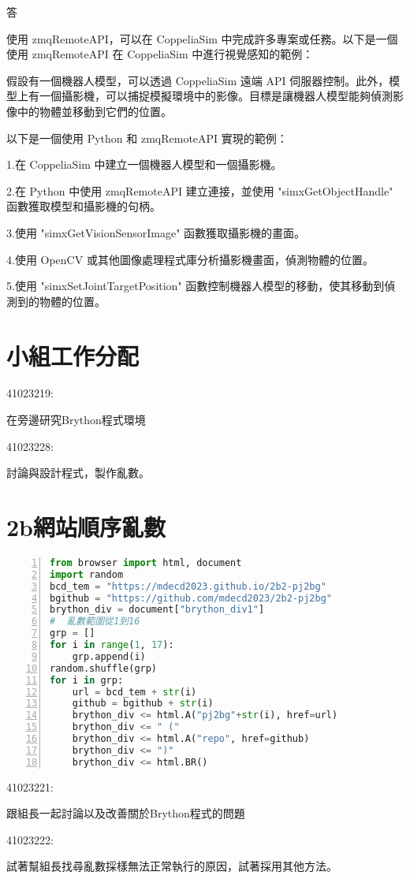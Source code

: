 答

使用 zmqRemoteAPI，可以在 CoppeliaSim 中完成許多專案或任務。以下是一個使用 zmqRemoteAPI 在 CoppeliaSim 中進行視覺感知的範例：

假設有一個機器人模型，可以透過 CoppeliaSim 遠端 API 伺服器控制。此外，模型上有一個攝影機，可以捕捉模擬環境中的影像。目標是讓機器人模型能夠偵測影像中的物體並移動到它們的位置。

以下是一個使用 Python 和 zmqRemoteAPI 實現的範例：

1.在 CoppeliaSim 中建立一個機器人模型和一個攝影機。

2.在 Python 中使用 zmqRemoteAPI 建立連接，並使用 "simxGetObjectHandle" 函數獲取模型和攝影機的句柄。

3.使用 "simxGetVisionSensorImage" 函數獲取攝影機的畫面。

4.使用 OpenCV 或其他圖像處理程式庫分析攝影機畫面，偵測物體的位置。

5.使用 "simxSetJointTargetPosition" 函數控制機器人模型的移動，使其移動到偵測到的物體的位置。




\section{小組工作分配}
41023219: 

在旁邊研究Brython程式環境

41023228: 

討論與設計程式，製作亂數。
\section{2b網站順序亂數}
\begin{lstlisting}[language=Python, frame=single, numbers=left, captionpos=b, basicstyle=\ttfamily\small, showstringspaces=false, breaklines=true, tabsize=4, xleftmargin=15pt]
from browser import html, document
import random
bcd_tem = "https://mdecd2023.github.io/2b2-pj2bg"
bgithub = "https://github.com/mdecd2023/2b2-pj2bg"
brython_div = document["brython_div1"]
#  亂數範圍從1到16
grp = []
for i in range(1, 17):
    grp.append(i)
random.shuffle(grp)
for i in grp:
    url = bcd_tem + str(i)
    github = bgithub + str(i)
    brython_div <= html.A("pj2bg"+str(i), href=url)
    brython_div <= " ("
    brython_div <= html.A("repo", href=github)
    brython_div <= ")"
    brython_div <= html.BR()
\end{lstlisting}

41023221: 

跟組長一起討論以及改善關於Brython程式的問題

41023222: 

試著幫組長找尋亂數採樣無法正常執行的原因，試著採用其他方法。

